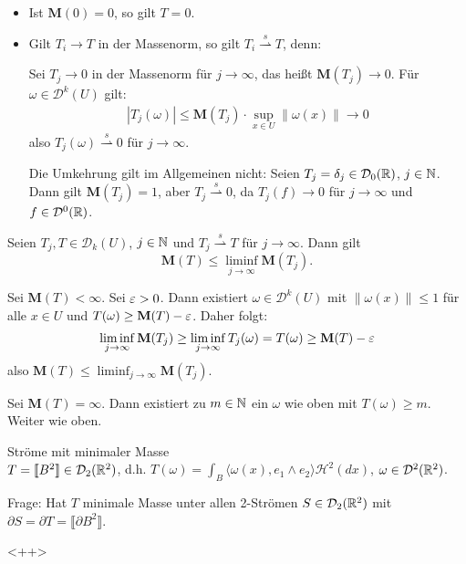 \documentclass[a4paper,twoside,DIV15,BCOR12mm]{scrbook}
\newcommand{\HM}{\mathscr H}
\newcommand{\MN}{\mathbf M}
\begin{document}
\begin{bemerkung}
\begin{itemize}
\item Ist $\MN(0)=0$, so gilt $T=0$.
\item Gilt $T_i\to T$ in der Massenorm, so gilt $T_i \stackrel{s}{\rightharpoonup} T$, denn:

Sei $T_j\to 0$ in der Massenorm für $j\to\infty$, das heißt $\MN(T_j) \to 0$. Für $\omega\in\mathcal D^k(U)$ gilt:
\begin{align*}
|T_j(\omega)| \le \MN(T_j) \cdot \sup_{x\in U}\|\omega(x)\| \to 0
\end{align*}
also $T_j(\omega) \stackrel{s}{\rightharpoonup} 0$ für $j\to\infty$.

Die Umkehrung gilt im Allgemeinen nicht: Seien $T_j = \delta_j\in\mathcal D_0(\mathbb{R})$, $j\in \mathbb{N}$. Dann gilt $\mathbf{M}(T_j)=1$, aber $T_j \stackrel s\rightharpoonup 0$, da $T_j(f) \to 0$ für $j\to\infty$ und $f\in\mathcal{D}^0(\mathbb{R})$.
\end{itemize}
\end{bemerkung}

\begin{lemma}
\label{lem:4.10}
Seien $T_j, T \in\mathcal D_k(U)$, $j\in\mathbb{N}$ und $T_j \stackrel s\rightharpoonup T$ für $j\to\infty$. 
Dann gilt
\[
\MN(T) \le \liminf_{j\to\infty} \MN(T_j).
\]
\end{lemma}

\begin{beweis}
Sei $\MN(T)<\infty$. Sei $\varepsilon >0$. Dann existiert $\omega\in\mathcal D^k(U)$ mit $\|\omega(x)\|\le 1$ für alle $x\in U$ und $T(\omega)\ge \MN(T) - \ep$. Daher folgt:
\[
\liminf_{j\to\infty} \MN(T_j) \ge \liminf_{j\to\infty} T_j(\omega) = T(\omega) \ge \MN(T)-\ep
\]
also  $\MN(T) \le \liminf_{j\to\infty} \MN(T_j)$.

Sei $\MN(T)=\infty$. Dann existiert zu $m\in\mathbb{N}$ ein $\omega$ wie oben mit $T(\omega) \ge m$. Weiter wie oben.
\end{beweis}

\begin{beispiel}
Ströme mit minimaler Masse \\
$T = \llbracket B^2 \rrbracket \in \mathcal D_2 (\mathbb{R}^2)$, d.h. $T(\omega) = \int_B \langle\omega(x),e_1\wedge e_2\rangle \HM^2(dx)$, $\omega \in \mathcal D^2(\mathbb{R}^2)$. 

Frage: Hat $T$ minimale Masse unter allen 2-Strömen $S \in \mathcal D_2(\mathbb{R}^2)$ mit $\partial S = \partial T = \llbracket \partial B^2 \rrbracket$.
\end{beispiel}<++>
\end{document}
